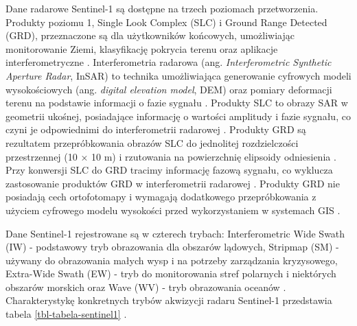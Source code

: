 \documentclass{amuthesis}
\begin{document}
Dane radarowe Sentinel-1 są dostępne na trzech poziomach przetworzenia.
Produkty poziomu 1, Single Look Complex (SLC) i Ground Range Detected
(GRD), przeznaczone są dla użytkowników końcowych, umożliwiając
monitorowanie Ziemi, klasyfikację pokrycia terenu oraz aplikacje
interferometryczne \autocite{hejmanowska_2020_dane}. Interferometria
radarowa (ang. \emph{Interferometric Synthetic Aperture Radar}, InSAR)
to technika umożliwiająca generowanie cyfrowych modeli wysokościowych
(ang. \emph{digital elevation model}, DEM) oraz pomiary deformacji
terenu na podstawie informacji o fazie sygnału
\autocite{hanssen_2001_insar,hejmanowska_2020_dane}. Produkty SLC to
obrazy SAR w geometrii ukośnej, posiadające informację o wartości
amplitudy i fazie sygnału, co czyni je odpowiednimi do interferometrii
radarowej \autocite{hejmanowska_2020_dane}. Produkty GRD są rezultatem
przepróbkowania obrazów SLC do jednolitej rozdzielczości przestrzennej
(10 × 10 m) i rzutowania na powierzchnię elipsoidy odniesienia
\autocite{hejmanowska_2020_dane}. Przy konwersji SLC do GRD tracimy
informację fazową sygnału, co wyklucza zastosowanie produktów GRD w
interferometrii radarowej \autocite{sentinel1_products}. Produkty GRD
nie posiadają cech ortofotomapy i wymagają dodatkowego przepróbkowania z
użyciem cyfrowego modelu wysokości przed wykorzystaniem w systemach GIS
\autocite{hejmanowska_2020_dane}.

Dane Sentinel-1 rejestrowane są w czterech trybach: Interferometric Wide
Swath (IW) - podstawowy tryb obrazowania dla obszarów lądowych, Stripmap
(SM) - używany do obrazowania małych wysp i na potrzeby zarządzania
kryzysowego, Extra-Wide Swath (EW) - tryb do monitorowania stref
polarnych i niektórych obszarów morskich oraz Wave (WV) - tryb
obrazowania oceanów
\autocite{hejmanowska_2020_dane,sentinel1_instrument_payload,sentinel1_stripmap}.
Charakterystykę konkretnych trybów akwizycji radaru Sentinel-1
przedstawia tabela \ref{tbl-tabela-sentinel1}
\autocite{sentinel1_resolution_swath}.
\end{document}
